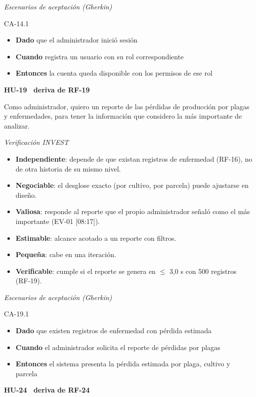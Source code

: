 \documentclass[12pt,a4paper]{article}
\begin{document}
\smallskip
\noindent\textit{Escenarios de aceptación (Gherkin)}

\noindent CA-14.1
\begin{itemize}
\item[] \textbf{Dado} que el administrador inició sesión
\item[] \textbf{Cuando} registra un usuario con su rol correspondiente
\item[] \textbf{Entonces} la cuenta queda disponible con los permisos de ese rol
\end{itemize}

\bigskip
\noindent\textbf{HU-19 \textperiodcentered\ deriva de RF-19}

\smallskip
\noindent Como administrador, quiero un reporte de las pérdidas de producción por plagas y enfermedades, para tener la información que considero la más importante de analizar.

\smallskip
\noindent\textit{Verificación INVEST}
\begin{itemize}
\item \textbf{Independiente}: depende de que existan registros de enfermedad (RF-16), no de otra historia de su mismo nivel.
\item \textbf{Negociable}: el desglose exacto (por cultivo, por parcela) puede ajustarse en diseño.
\item \textbf{Valiosa}: responde al reporte que el propio administrador señaló como el más importante (EV-01 [08:17]).
\item \textbf{Estimable}: alcance acotado a un reporte con filtros.
\item \textbf{Pequeña}: cabe en una iteración.
\item \textbf{Verificable}: cumple si el reporte se genera en $\leq$ 3,0 s con 500 registros (RF-19).
\end{itemize}

\smallskip
\noindent\textit{Escenarios de aceptación (Gherkin)}

\noindent CA-19.1
\begin{itemize}
\item[] \textbf{Dado} que existen registros de enfermedad con pérdida estimada
\item[] \textbf{Cuando} el administrador solicita el reporte de pérdidas por plagas
\item[] \textbf{Entonces} el sistema presenta la pérdida estimada por plaga, cultivo y parcela
\end{itemize}

\bigskip
\noindent\textbf{HU-24 \textperiodcentered\ deriva de RF-24}
\end{document}

